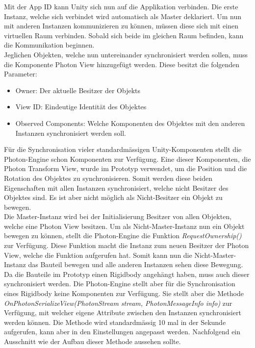 Mit der App ID kann Unity sich nun auf die Applikation verbinden. Die erste Instanz, welche sich verbindet wird automatisch als Master deklariert. Um nun mit anderen Instanzen kommunizieren zu können, müssen diese sich mit einen virtuellen Raum verbinden. Sobald sich beide im gleichen Raum befinden, kann die Kommunikation beginnen.\\
Jeglichen Objekten, welche nun untereinander synchronisiert werden sollen, muss die Komponente Photon View hinzugefügt werden. Diese besitzt die folgenden Parameter:
\begin{itemize} [itemsep=1pt]
	\item Owner: Der aktuelle Besitzer der Objekts
	\item View ID: Eindeutige Identität des Objektes
	\item Observed Components: Welche Komponenten des Objektes mit den anderen Instanzen synchronisiert werden soll.
\end{itemize}

Für die Synchronisation vieler standardmässigen Unity-Komponenten stellt die Photon-Engine schon Komponenten zur Verfügung. Eine dieser Komponenten, die Photon Transform View, wurde im Prototyp verwendet, um die Position und die Rotation des Objektes zu synchronisieren. Somit werden diese beiden Eigenschaften mit allen Instanzen synchronisiert, welche nicht Besitzer des Objektes sind. Es ist aber nicht möglich als Nicht-Besitzer ein Objekt zu bewegen. \\
Die Master-Instanz wird bei der Initialisierung Besitzer von allen Objekten, welche eine Photon View besitzen. Um als Nicht-Master-Instanz nun ein Objekt bewegen zu können, stellt die Photon-Engine die Funktion \textit{RequestOwnership()} zur Verfügung. Diese Funktion macht die Instanz zum neuen Besitzer der Photon View, welche die Funktion aufgerufen hat. Somit kann nun die Nicht-Master-Instanz das Bauteil bewegen und alle anderen Instanzen sehen diese Bewegung. \\

\noindent Da die Bauteile im Prototyp einen Rigidbody angehängt haben, muss auch dieser synchronisiert werden. Die Photon-Engine stellt aber für die Synchronisation eines Rigidbody keine Komponenten zur Verfügung. Sie stellt aber die Methode \textit{OnPhotonSerializeView(PhotonStream stream, PhotonMessageInfo info)} zur Verfügung, mit welcher eigene Attribute zwischen den Instanzen synchronisiert werden können. Die Methode wird standardmässig 10 mal in der Sekunde aufgerufen, kann aber in den Einstellungen angepasst werden. Nachfolgend ein Ausschnitt wie der Aufbau dieser Methode aussehen sollte.

